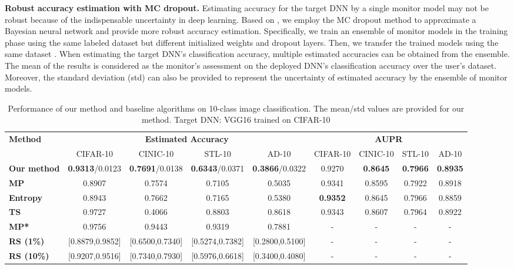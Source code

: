 \documentclass{article}
\begin{document}
\textbf{Robust accuracy estimation with MC dropout.} Estimating accuracy for the target DNN by a single monitor model may not be robust because of the indispensable uncertainty in deep learning.  Based on \cite{MC_dropout_approximation_2016}, we employ
the  MC dropout method to approximate a Bayesian neural network and provide more robust accuracy estimation. 
Specifically, we train an ensemble of monitor models in the training phase using the same labeled dataset but different initialized weights and dropout layers. Then, we transfer the trained models using the same dataset . When estimating the target DNN's classification accuracy, multiple estimated accuracies can be obtained from the ensemble. The mean of the results is considered as the monitor's
assessment on the deployed DNN's classification accuracy over the user's dataset.
Moreover,
the standard deviation (std) can also be provided to represent the uncertainty of estimated accuracy by the ensemble of monitor models. \begin{table*}[!t]
	\centering
	\caption{Performance of our method and baseline algorithms on 10-class image classification. The mean/std values are provided for our method. Target DNN: VGG16 trained on CIFAR-10}
	\setlength{\tabcolsep}{5pt}
	\vspace{-0.1cm}
	\small

	\begin{tabular}{l|cccc|cccc}
		\hline
		\multirow{2}{*}{\textbf{Method}} & \multicolumn{4}{c|}{\textbf{Estimated Accuracy}} & \multicolumn{4}{c}{\textbf{AUPR}} \\
		\cline{2-9}      & CIFAR-10 & CINIC-10 & STL-10 & AD-10 & CIFAR-10 & CINIC-10 & STL-10 & AD-10 \\
		\hline
		\multicolumn{1}{l|}{\textbf{Our method}} & \textbf{0.9313}/0.0123 & \textbf{0.7691}/0.0138 & \textbf{0.6343}/0.0371 & \textbf{0.3866}/0.0322 & 0.9270 & \textbf{0.8645} & \textbf{0.7966} & \textbf{0.8935} \\
		\multicolumn{1}{p{5.5em}|}{\textbf{MP}} & 0.8907 & 0.7574 & 0.7105 & 0.5035 & 0.9341 & 0.8595 & 0.7922 & 0.8918 \\
		\multicolumn{1}{p{5.5em}|}{\textbf{Entropy}} & 0.8943 & 0.7662 & 0.7165 & 0.5380 & \textbf{0.9352} & 0.8645 & 0.7966 & 0.8859 \\
		\textbf{TS} & 0.9727 & 0.4066 & 0.8803 & 0.8618 & 0.9343 & 0.8607 & 0.7964 & 0.8922 \\
		\multicolumn{1}{p{5.5em}|}{\textbf{MP*}} & 0.9756 & 0.9443 & 0.9319 & 0.7881 & -     & -     & -     & - \\
		\textbf{RS (1\%)} & [0.8879,0.9852] & [0.6500,0.7340] & [0.5274,0.7382] & [0.2800,0.5100] & -     & -     & -     & - \\
		\textbf{RS (10\%)} & [0.9207,0.9516] & [0.7340,0.7930] & [0.5976,0.6618] & [0.3400,0.4080] & -     & -     & -     & - \\
		\hline
	\end{tabular}\label{tab:DNN_10classy}\vspace{-0.3cm}
\end{table*}
\end{document}
